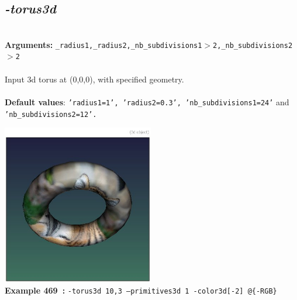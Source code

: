 \documentclass[a4paper,11pt,twoside]{book}
\begin{document}
\subsection{\emph{-torus3d} }\vspace*{-0.5em}
~\\\textbf{Arguments: } 
{\small \texttt{\_radius1,\_radius2,\_nb\_subdivisions1$>$2,\_nb\_subdivisions2$>$2}}\\~\\
Input 3d torus at (0,0,0), with specified geometry.
~\\~\\\textbf{Default values}: {\small \texttt{'radius1=1', 'radius2=0.3', 'nb\_subdivisions1=24'} and \texttt{'nb\_subdivisions2=12'.}}
\begin{center}\includegraphics[keepaspectratio=true,height=7cm,width=\textwidth]{img/gmic_def469.jpg}\\
{\footnotesize \textbf{Example 469~:} \texttt{-torus3d 10,3 --primitives3d 1 -color3d[-2] @\{-RGB\}}}
\end{center}
\end{document}
